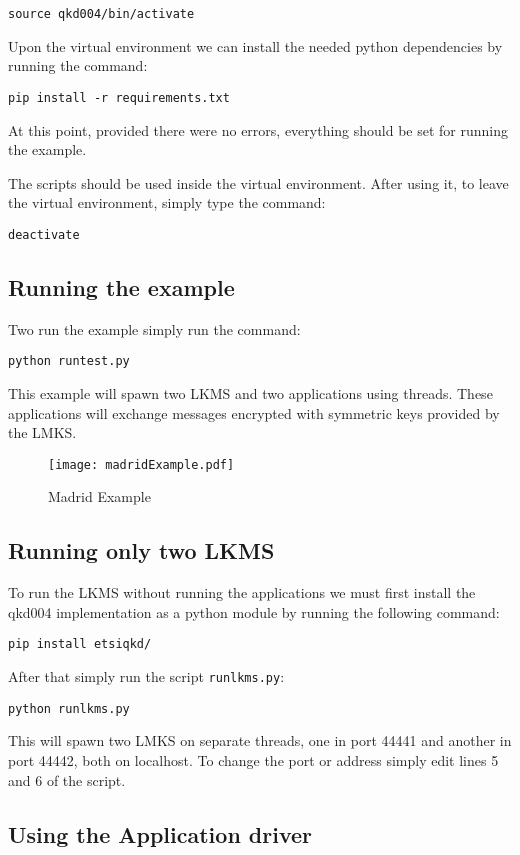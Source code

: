 \begin{refsection}
\texttt{source qkd004/bin/activate}

Upon the virtual environment we can install the needed python dependencies by running the command:

\texttt{pip install -r requirements.txt}

At this point, provided there were no errors, everything should be set for running the example.

The scripts should be used inside the virtual environment. After using it, to leave the virtual environment, simply type the command:

\texttt{deactivate}

\subsection{Running the example}

Two run the example simply run the command:

\texttt{python run\textunderscore test.py}

This example will spawn two LKMS and two applications using threads. These applications will exchange messages encrypted with symmetric keys provided by the LMKS.

\begin{figure}[H]
	\centering
	\texttt{[image: madridExample.pdf]}
	\caption{Madrid Example}
	\label{fig:madridExample}
\end{figure}

\subsection{Running only two LKMS}

To run the LKMS without running the applications we must first install the qkd004 implementation as a python module by running the following command:

\texttt{pip install etsi\textunderscore qkd/}

After that simply run the script \texttt{run\textunderscore lkms.py}:

\texttt{python run\textunderscore lkms.py}

This will spawn two LMKS on separate threads, one in port 44441 and another in port 44442, both on localhost. To change the port or address simply edit lines 5 and 6 of the script.

\subsection{Using the Application driver}


\end{refsection}
